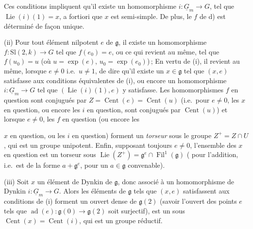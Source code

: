 \documentclass[11pt,a4paper]{article}
\begin{document}
Ces conditions impliquent qu'il existe un homomorphisme
$i\colon\underline{G}_m\to G$, tel que $\operatorname{Lie}(i)(1)=x$, a
fortiori que $x$ est semi-simple. De plus, le $f$ de d) est déterminé de façon
unique.

(ii) Pour tout élément nilpotent $e$ de $\mathfrak{g}$, il existe un
homomorphisme $f\colon\mathrm{Sl}(2,k)\to G$ tel que $f(e_0)=e$, ou ce qui
revient au même, tel que $f(u_0)=u$ (où $u=\exp(e)$, $u_0=\exp(e_0)$)\,;
En vertu de (i), il revient au même, lorsque $e\neq 0$ i.e.\ $u\neq 1$, de
dire qu'il existe un $x\in\mathfrak{g}$ tel que $(x,e)$ satisfasse aux
conditions équivalentes de (i), ou encore un homomorphisme
$i\colon\underline{G}_m\to G$ tel que $(\operatorname{Lie}(i)(1),e)$ y
satisfasse. Les homomorphismes $f$ en question sont conjugués par
$Z=\operatorname{Cent}(e)=\operatorname{Cent}(u)$ (i.e.\ pour $e\neq 0$, les
$x$ en question, ou encore les $i$ en question, sont conjugués par
$\operatorname{Cent}(u)$) et lorsque $e\neq 0$, les $f$ en question (ou encore
les

$x$ en question, ou les $i$ en question) forment un \emph{torseur} sous le
groupe $Z^{+}=Z\cap U$ , qui est un groupe
unipotent. Enfin, supposant
toujours $e\neq 0$, l'ensemble des $x$ en question est un torseur sous
$\operatorname{Lie}(Z^{+})=\mathfrak{g}^{e}\cap\operatorname{Fil}^{1}
(\mathfrak{g})$ ( pour l'addition, i.e.\ est de la forme
$a+\mathfrak{g}^{e}$, pour un $a\in\mathfrak{g}$ convenable).

(iii) Soit $x$  un élément de Dynkin de $\mathfrak{g}$, donc
associé à un homomorphisme de Dynkin $i\colon\underline{G}_m\to G$. Alors les
éléments  de $\mathfrak{g}$ tels que $(x,e)$ satisfassent aux
conditions de (i) forment un ouvert dense
 de $\mathfrak{g}(2)$ (savoir l'ouvert des points
$e$ tels que $\operatorname{ad}(e)\colon\mathfrak{g}(0)\to\mathfrak{g}(2)$
soit surjectif),  est un   sous  $\operatorname{Cent}(x)=\operatorname{Cent}(i)$,
qui est un groupe réductif.
\end{document}
